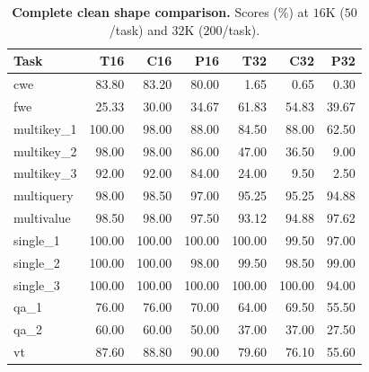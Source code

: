 \begin{table}[ht]
\centering\small
\caption{\textbf{Complete clean shape comparison.} Scores (\%) at $16$K ($50$/task) and $32$K ($200$/task).}
\label{tab:clean-c-new}
\begin{tabular}{@{}lrrrrrr@{}}
\toprule
Task & T16 & C16 & P16 & T32 & C32 & P32 \\
\midrule
cwe & 83.80 & 83.20 & 80.00 & 1.65 & 0.65 & 0.30 \\
fwe & 25.33 & 30.00 & 34.67 & 61.83 & 54.83 & 39.67 \\
multikey\_1 & 100.00 & 98.00 & 88.00 & 84.50 & 88.00 & 62.50 \\
multikey\_2 & 98.00 & 98.00 & 86.00 & 47.00 & 36.50 & 9.00 \\
multikey\_3 & 92.00 & 92.00 & 84.00 & 24.00 & 9.50 & 2.50 \\
multiquery & 98.00 & 98.50 & 97.00 & 95.25 & 95.25 & 94.88 \\
multivalue & 98.50 & 98.00 & 97.50 & 93.12 & 94.88 & 97.62 \\
single\_1 & 100.00 & 100.00 & 100.00 & 100.00 & 99.50 & 97.00 \\
single\_2 & 100.00 & 100.00 & 98.00 & 99.50 & 98.50 & 99.00 \\
single\_3 & 100.00 & 100.00 & 100.00 & 100.00 & 100.00 & 94.00 \\
qa\_1 & 76.00 & 76.00 & 70.00 & 64.00 & 69.50 & 55.50 \\
qa\_2 & 60.00 & 60.00 & 50.00 & 37.00 & 37.00 & 27.50 \\
vt & 87.60 & 88.80 & 90.00 & 79.60 & 76.10 & 55.60 \\
\bottomrule
\end{tabular}
\end{table}
